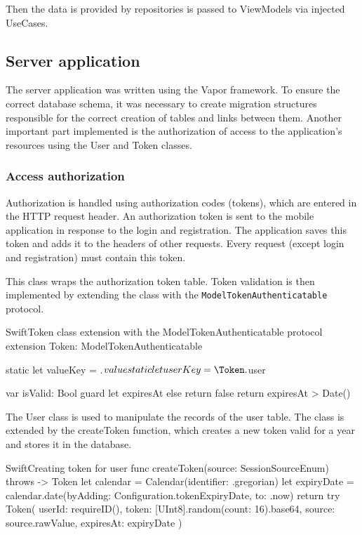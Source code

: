 \documentclass[
  biblatex,
  language=english,
  figures=false,
  sourcecodes,
  glossaries,
  index
]{kidiplom}
\begin{document}
Then the data is provided by repositories is passed to ViewModels via injected UseCases.

\subsection{Server application}
The server application was written using the Vapor framework. To ensure the correct database schema, it was necessary to create migration structures responsible for the correct creation of tables and links between them. Another important part implemented is the authorization of access to the application's resources using the User and Token classes.

\subsubsection{Access authorization}
Authorization is handled using authorization codes (tokens), which are entered in the HTTP request header. An authorization token is sent to the mobile application in response to the login and registration. The application saves this token and adds it to the headers of other requests. Every request (except login and registration) must contain this token.

This class wraps the authorization token table. Token validation is then implemented by extending the class with the \texttt{ModelTokenAuthenticatable} protocol.

\begin{kicode}{Swift}{}{Token class extension with the ModelTokenAuthenticatable protocol}
extension Token: ModelTokenAuthenticatable {
  static let valueKey = \Token.$value
  static let userKey = \Token.$user
  
  var isValid: Bool {
    guard let expiresAt else {
      return false
    }
    return expiresAt > Date()
  }
}
\end{kicode}

The User class is used to manipulate the records of the user table. The class is extended by the createToken function, which creates a new token valid for a year and stores it in the database.

\begin{kicode}{Swift}{}{Creating token for user}
func createToken(source: SessionSourceEnum) throws -> Token {
        let calendar = Calendar(identifier: .gregorian)
        let expiryDate = calendar.date(byAdding: Configuration.tokenExpiryDate, to: .now)
        return try Token(
            userId: requireID(),
            token: [UInt8].random(count: 16).base64,
            source: source.rawValue,
            expiresAt: expiryDate
        )
}
\end{kicode}
\end{document}
